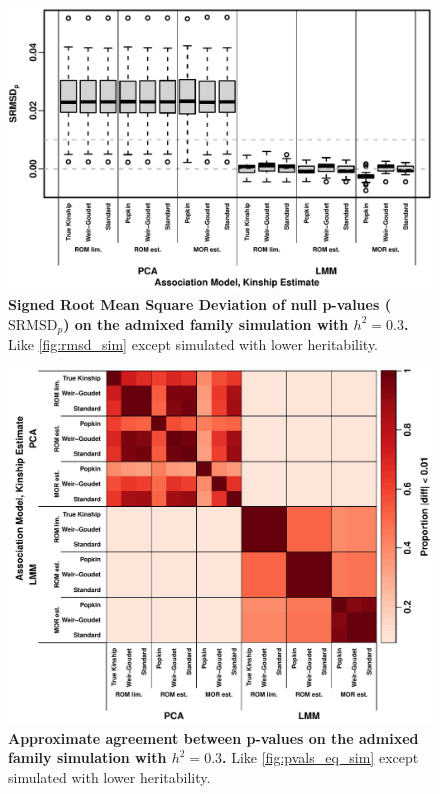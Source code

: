 \documentclass[11pt]{article}
\newcommand{\rmsd}{\text{SRMSD}_p}
\begin{document}
\begin{figure}[hp!]
  \centering
  \includegraphics[width=\textwidth]{sim-admix-n1000-m100000-k3-f0.3-s0.5-g20/h-0.3/rmsd.pdf}
  \caption{
    {\bf Signed Root Mean Square Deviation of null p-values ($\rmsd$) on the admixed family simulation with $h^2=0.3$.}
    Like \cref{fig:rmsd_sim} except simulated with lower heritability.
    }
  \label{fig:rmsd_sim-h3}
\end{figure}

\begin{figure}[bp!]
  \centering
  \includegraphics[width=\textwidth]{sim-admix-n1000-m100000-k3-f0.3-s0.5-g20/h-0.3/pvals_eq.pdf}
  \caption{
    {\bf Approximate agreement between p-values on the admixed family simulation with $h^2=0.3$.}
    Like \cref{fig:pvals_eq_sim} except simulated with lower heritability.
    }
  \label{fig:pvals_eq_sim-h3}
\end{figure}
\end{document}

